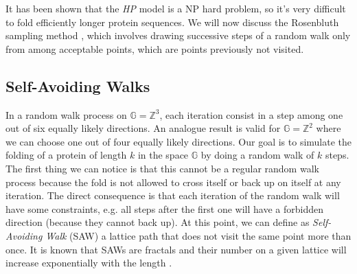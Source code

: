 It has been shown that the \emph{HP} model is a NP hard problem, so it's very difficult to fold efficiently longer protein sequences.
We will now discuss the Rosenbluth sampling method \cite{PERM}, which involves drawing successive steps of a random walk only from among acceptable points, which are points previously not visited.

\subsection{Self-Avoiding Walks}
In a random walk process on $\mathbb{G} = \mathbb{Z}^3$, each iteration consist in a step among one out of six equally likely directions.
An analogue result is valid for $\mathbb{G} = \mathbb{Z}^2$ where we can choose one out of four equally likely directions.
Our goal is to simulate the folding of a protein of length $k$ in the space $\mathbb{G}$ by doing a random walk of $k$ steps.
The first thing we can notice is that this cannot be a regular random walk process because the fold is not allowed to cross itself or back up on itself at any iteration.
The direct consequence is that each iteration of the random walk will have some constraints, e.g. all steps after the first one will have a forbidden direction (because they cannot back up).
At this point, we can define as \emph{Self-Avoiding Walk} (SAW) a lattice path that does not visit the same point more than once.
It is known that SAWs are fractals and their number on a given lattice will increase exponentially with the length \cite{madras1988pivot}.



